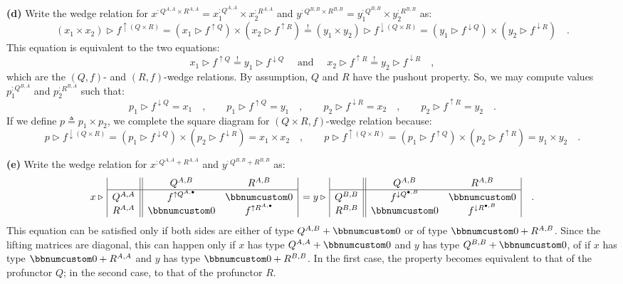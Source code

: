 \textbf{(d)} Write the wedge relation for $x^{:Q^{A,A}\times R^{A,A}}=x_{1}^{:Q^{A,A}}\times x_{2}^{:R^{A,A}}$
and $y^{:Q^{B,B}\times R^{B,B}}=y_{1}^{:Q^{B,B}}\times y_{2}^{:R^{B,B}}$
as:
\[
(x_{1}\times x_{2})\triangleright f^{\uparrow(Q\times R)}=(x_{1}\triangleright f^{\uparrow Q})\times(x_{2}\triangleright f^{\uparrow R})\overset{!}{=}(y_{1}\times y_{2})\triangleright f^{\downarrow(Q\times R)}=(y_{1}\triangleright f^{\downarrow Q})\times(y_{2}\triangleright f^{\downarrow R})\quad.
\]
This equation is equivalent to the two equations:
\[
x_{1}\triangleright f^{\uparrow Q}\overset{!}{=}y_{1}\triangleright f^{\downarrow Q}\quad\text{ and }\quad x_{2}\triangleright f^{\uparrow R}\overset{!}{=}y_{2}\triangleright f^{\downarrow R}\quad,
\]
which are the $\left(Q,f\right)$- and $\left(R,f\right)$-wedge relations.
By assumption, $Q$ and $R$ have the pushout property. So, we may
compute values $p_{1}^{:Q^{B,A}}$ and $p_{2}^{:R^{B,A}}$ such that:
\[
p_{1}\triangleright f^{\downarrow Q}=x_{1}\quad,\quad\quad p_{1}\triangleright f^{\uparrow Q}=y_{1}\quad,\quad\quad p_{2}\triangleright f^{\downarrow R}=x_{2}\quad,\quad\quad p_{2}\triangleright f^{\uparrow R}=y_{2}\quad.
\]
If we define $p\triangleq p_{1}\times p_{2}$, we complete the square
diagram for $\left(Q\times R,f\right)$-wedge relation because:
\[
p\triangleright f^{\downarrow(Q\times R)}=(p_{1}\triangleright f^{\downarrow Q})\times(p_{2}\triangleright f^{\downarrow R})=x_{1}\times x_{2}\quad,\quad\quad p\triangleright f^{\uparrow(Q\times R)}=(p_{1}\triangleright f^{\uparrow Q})\times(p_{2}\triangleright f^{\uparrow R})=y_{1}\times y_{2}\quad.
\]

\textbf{(e)} Write the wedge relation for $x^{:Q^{A,A}+R^{A,A}}$
and $y^{:Q^{B,B}+R^{B,B}}$ as:
\[
x\triangleright\,\begin{array}{|c||cc|}
 & Q^{A,B} & R^{A,B}\\
\hline Q^{A,A} & f^{\uparrow Q^{A,\bullet}} & \bbnum 0\\
R^{A,A} & \bbnum 0 & f^{\uparrow R^{A,\bullet}}
\end{array}\,=y\triangleright\,\begin{array}{|c||cc|}
 & Q^{A,B} & R^{A,B}\\
\hline Q^{B,B} & f^{\downarrow Q^{\bullet,B}} & \bbnum 0\\
R^{B,B} & \bbnum 0 & f^{\downarrow R^{\bullet,B}}
\end{array}\quad.
\]
This equation can be satisfied only if both sides are either of type
$Q^{A,B}+\bbnum 0$ or of type $\bbnum 0+R^{A,B}$. Since the lifting
matrices are diagonal, this can happen only if $x$ has type $Q^{A,A}+\bbnum 0$
and $y$ has type $Q^{B,B}+\bbnum 0$, of if $x$ has type $\bbnum 0+R^{A,A}$
and $y$ has type $\bbnum 0+R^{B,B}$. In the first case, the property
becomes equivalent to that of the profunctor $Q$; in the second case,
to that of the profunctor $R$.

